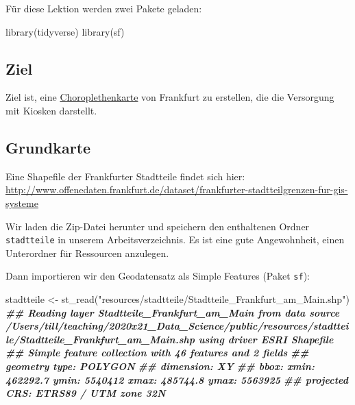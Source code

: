 \documentclass[
  ngerman,
]{article}
\newenvironment{Shaded}{\begin{snugshade}}{\end{snugshade}}
\newcommand{\DocumentationTok}[1]{\textcolor[rgb]{0.56,0.35,0.01}{\textbf{\textit{#1}}}}
\newcommand{\FunctionTok}[1]{\textcolor[rgb]{0.00,0.00,0.00}{#1}}
\newcommand{\NormalTok}[1]{#1}
\newcommand{\OtherTok}[1]{\textcolor[rgb]{0.56,0.35,0.01}{#1}}
\newcommand{\StringTok}[1]{\textcolor[rgb]{0.31,0.60,0.02}{#1}}
\begin{document}
Für diese Lektion werden zwei Pakete geladen:

\begin{Shaded}
\begin{Highlighting}[]
\FunctionTok{library}\NormalTok{(tidyverse)}
\FunctionTok{library}\NormalTok{(sf)}
\end{Highlighting}
\end{Shaded}

\hypertarget{ziel}{%
\subsection{Ziel}\label{ziel}}

Ziel ist, eine \href{https://de.wikipedia.org/wiki/Choroplethenkarte}{Choroplethenkarte} von Frankfurt zu erstellen, die die Versorgung mit Kiosken darstellt.

\hypertarget{grundkarte}{%
\subsection{Grundkarte}\label{grundkarte}}

Eine Shapefile der Frankfurter Stadtteile findet sich hier: \url{http://www.offenedaten.frankfurt.de/dataset/frankfurter-stadtteilgrenzen-fur-gis-systeme}

Wir laden die Zip-Datei herunter und speichern den enthaltenen Ordner \texttt{stadtteile} in unserem Arbeitsverzeichnis. Es ist eine gute Angewohnheit, einen Unterordner für Ressourcen anzulegen.

Dann importieren wir den Geodatensatz als Simple Features (Paket \texttt{sf}):

\begin{Shaded}
\begin{Highlighting}[]
\NormalTok{stadtteile }\OtherTok{\textless{}{-}} \FunctionTok{st\_read}\NormalTok{(}\StringTok{"resources/stadtteile/Stadtteile\_Frankfurt\_am\_Main.shp"}\NormalTok{)}
\DocumentationTok{\#\# Reading layer \textasciigrave{}Stadtteile\_Frankfurt\_am\_Main\textquotesingle{} from data source \textasciigrave{}/Users/till/teaching/2020x21\_Data\_Science/public/resources/stadtteile/Stadtteile\_Frankfurt\_am\_Main.shp\textquotesingle{} using driver \textasciigrave{}ESRI Shapefile\textquotesingle{}}
\DocumentationTok{\#\# Simple feature collection with 46 features and 2 fields}
\DocumentationTok{\#\# geometry type:  POLYGON}
\DocumentationTok{\#\# dimension:      XY}
\DocumentationTok{\#\# bbox:           xmin: 462292.7 ymin: 5540412 xmax: 485744.8 ymax: 5563925}
\DocumentationTok{\#\# projected CRS:  ETRS89 / UTM zone 32N}
\end{Highlighting}
\end{Shaded}
\end{document}
